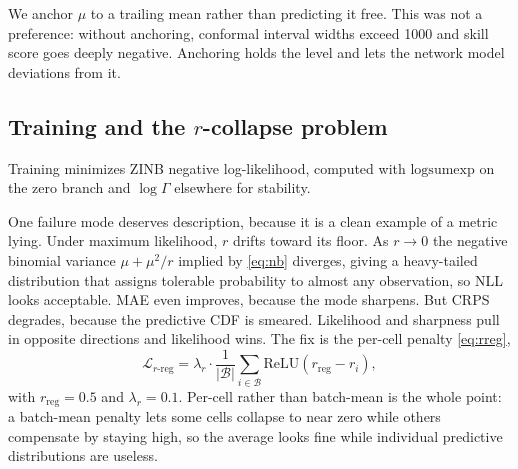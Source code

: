 \documentclass[journal,10pt,twocolumn]{IEEEtran}
\begin{document}
We anchor $\mu$ to a trailing mean rather than predicting it free. This was not a
preference: without anchoring, conformal interval widths exceed 1000 and skill
score goes deeply negative. Anchoring holds the level and lets the network model
deviations from it.

\subsection{Training and the $r$-collapse problem}
\label{sec:rcollapse}
Training minimizes ZINB negative log-likelihood, computed with
$\mathrm{logsumexp}$ on the zero branch and $\log\Gamma$ elsewhere for stability.

One failure mode deserves description, because it is a clean example of a metric
lying. Under maximum likelihood, $r$ drifts toward its floor. As $r \to 0$ the
negative binomial variance $\mu + \mu^2/r$ implied by \eqref{eq:nb} diverges,
giving a heavy-tailed
distribution that assigns tolerable probability to almost any observation, so NLL
looks acceptable. MAE even improves, because the mode sharpens. But CRPS
degrades, because the predictive CDF is smeared. Likelihood and sharpness pull in
opposite directions and likelihood wins. The fix is the per-cell penalty
\eqref{eq:rreg},
\begin{equation}
\label{eq:rreg}
\mathcal{L}_{r\text{-reg}}
 = \lambda_r \cdot \frac{1}{|\mathcal{B}|}
   \sum_{i \in \mathcal{B}} \mathrm{ReLU}(r_{\mathrm{reg}} - r_i),
\end{equation}
with $r_{\mathrm{reg}} = 0.5$ and $\lambda_r = 0.1$. Per-cell rather than
batch-mean is the whole point: a batch-mean penalty lets some cells collapse to
near zero while others compensate by staying high, so the average looks fine
while individual predictive distributions are useless.
\end{document}

